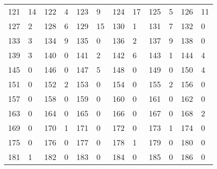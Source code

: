 \begin{longtable}{llllllllllll}
121 & 14&122 &4&123& 9&124 &17&125 &5&126& 11\\
127 & 2&128 &6&129& 15&130 &1&131 &7&132& 0\\
133 & 3&134 &9&135& 0&136 &2&137 &9&138& 0\\
139 & 3&140 &0&141& 2&142 &6&143 &1&144& 4\\
145 & 0&146 &0&147& 5&148 &0&149 &0&150& 4\\
151 & 0&152 &2&153& 0&154 &0&155 &2&156& 0\\
157 & 0&158 &0&159& 0&160 &0&161 &0&162& 0\\
163 & 0&164 &0&165& 0&166 &0&167 &0&168& 2\\
169 & 0&170 &1&171& 0&172 &0&173 &1&174& 0\\
175 & 0&176 &0&177& 0&178 &1&179 &0&180& 0\\
181 & 1&182 &0&183& 0&184 &0&185 &0&186& 0\\
\bottomrule\end{longtable}

